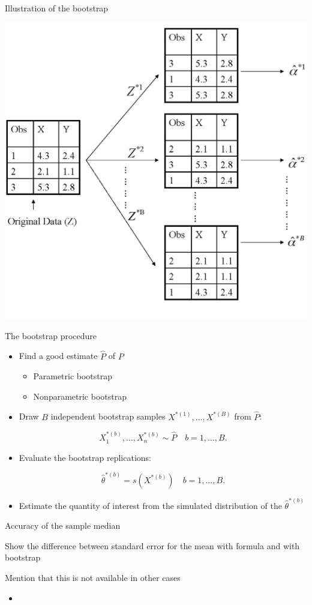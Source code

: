 \documentclass[14pt]{beamer}
\begin{document}
\begin{frame}[plain]{Illustration of the bootstrap}

\begin{center}
\includegraphics[width=.7\textwidth]{5-11.png}	
\end{center}
\end{frame}

\begin{frame}[plain]{The bootstrap procedure}
\begin{itemize}
	\item Find a good estimate $\hat P$ of $P$
	\begin{itemize}
		\item Parametric bootstrap
		\item Nonparametric bootstrap
	\end{itemize}
	\item Draw $B$ independent bootstrap samples $X^{*(1)}, \dots, X^{*(B)}$ from $\hat P$:

	$$X_1^{*(b)}, \dots, X_n^{*(b)} \sim \hat P \quad b = 1, \dots, B.$$ 	
	
	\item Evaluate the bootstrap replications:
 
		$$\hat \theta^{*(b)} = s(X^{*(b)}) \quad b = 1, \dots, B.$$	

	\item Estimate the quantity of interest from the simulated distribution of the $\hat \theta^{*(b)}$
\end{itemize}
\end{frame}

\begin{frame}[plain]{Accuracy of the sample median}

Show the difference between standard error for the mean with formula and with bootstrap

Mention that this is not available in other cases

\begin{itemize}
	\item 
\end{itemize}
\end{frame}
\end{document}

